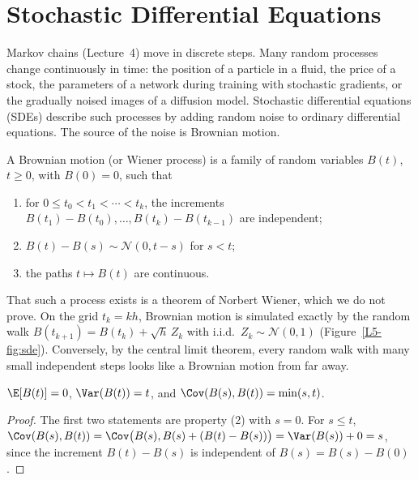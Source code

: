 \section{Stochastic Differential Equations}\label{L5-sec:sde}

Markov chains (Lecture~4) move in discrete steps. Many random processes change continuously in time: the position of a particle in a fluid, the price of a stock, the parameters of a network during training with stochastic gradients, or the gradually noised images of a diffusion model. Stochastic differential equations (SDEs) describe such processes by adding random noise to ordinary differential equations. The source of the noise is Brownian motion.

\begin{definition}\label{L5-def:brownian}
    A Brownian motion (or Wiener process) is a family of random variables $B(t)$, $t \geq 0$, with $B(0) = 0$, such that
    \begin{enumerate}
        \item for $0 \leq t_0 < t_1 < \cdots < t_k$, the increments $B(t_1) - B(t_0), \ldots, B(t_k) - B(t_{k-1})$ are independent;
        \item $B(t) - B(s) \sim \mathcal{N}(0, t - s)$ for $s < t$;
        \item the paths $t \mapsto B(t)$ are continuous.
    \end{enumerate}
\end{definition}

That such a process exists is a theorem of Norbert Wiener, which we do not prove. On the grid $t_k = kh$, Brownian motion is simulated exactly by the random walk $B(t_{k+1}) = B(t_k) + \sqrt{h}\,Z_k$ with i.i.d.\ $Z_k \sim \mathcal{N}(0, 1)$ (Figure~\ref{L5-fig:sde}). Conversely, by the central limit theorem, every random walk with many small independent steps looks like a Brownian motion from far away.

\begin{proposition}\label{L5-prop:brownian}
    $\E[B(t)] = 0$, $\Var(B(t)) = t$, and $\Cov(B(s), B(t)) = \min(s, t)$.
\end{proposition}

\begin{proof}
    The first two statements are property (2) with $s = 0$. For $s \leq t$, $\Cov(B(s), B(t)) = \Cov\big(B(s), B(s) + (B(t) - B(s))\big) = \Var(B(s)) + 0 = s$, since the increment $B(t) - B(s)$ is independent of $B(s) = B(s) - B(0)$.
\end{proof}

